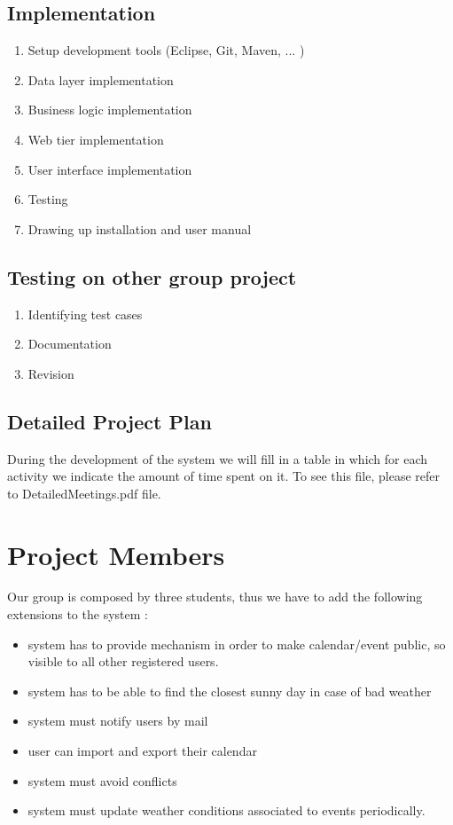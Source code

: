 \documentclass[12pt]{book}
\begin{document}
\section{Implementation}
\begin{enumerate}
	\item Setup development tools (Eclipse, Git, Maven, ... ) 
	\item Data layer implementation
	\item Business logic implementation
	\item Web tier implementation
	\item User interface implementation 
	\item Testing
	\item Drawing up installation and user manual
\end{enumerate}

\section{Testing on other group project}
\begin{enumerate}
	\item Identifying test cases  
	\item Documentation
	\item Revision
\end{enumerate}

\section{Detailed Project Plan}
During the development of the system we will fill in a table in which for each activity we indicate the amount of time spent on it. To see this file, please refer to DetailedMeetings.pdf file.  

\chapter{Project Members}
Our group is composed by three students, thus we have to add the following extensions to the system :  
\begin{itemize}
	\item system has to provide mechanism in order to make calendar/event public, so visible to all other registered users.  
	\item system has to be able to find the closest sunny day in case of bad weather
	\item system must notify users by mail 
	\item user can import and export their calendar
	\item system must avoid conflicts
	\item system must update weather conditions associated to events periodically. 
\end{itemize}
\end{document}
